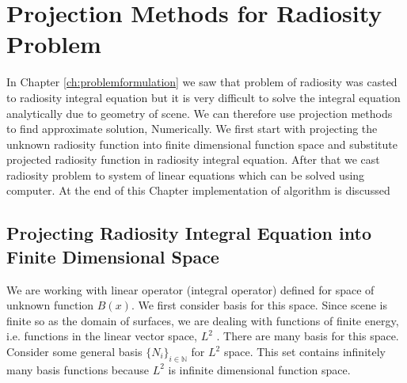 

\chapter{\label{ch:projection}Projection Methods for Radiosity Problem}
In Chapter \ref{ch:problemformulation} we saw that problem of radiosity was casted to radiosity integral equation but it is very difficult to solve the integral equation analytically due to geometry of scene. We can therefore use projection methods to find approximate solution, Numerically. We first start with projecting the unknown radiosity function into finite dimensional function space and substitute projected radiosity function in radiosity integral equation. After that we cast radiosity problem to system of linear equations which can be solved using computer. At the end of this Chapter implementation of algorithm is discussed \\

\section{Projecting Radiosity Integral Equation into Finite Dimensional Space}
We are working with linear operator (integral operator) defined for space of unknown function $B(x)$.  We first consider basis for this space. Since scene is finite so as the domain of surfaces, we are dealing with functions of finite energy, i.e. functions
in the linear vector space, $L^2$ . There are many basis for
this space. Consider some general basis $\{N_i \}_{i \in \mathbb{N}}$ for $L^2$ space. This set contains infinitely many basis functions because $L^2$ is infinite dimensional function space.

